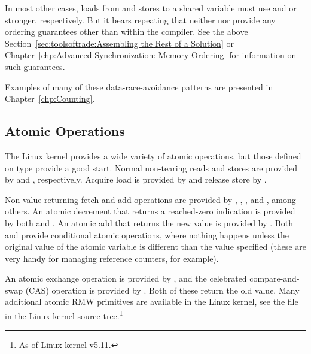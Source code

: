 \QuickQuizEnd

In most other cases, loads from and stores to a shared variable must
use  and  or stronger, respectively.
But it bears repeating that neither  nor 
provide any ordering guarantees other than within the compiler.
See the above
Section~\ref{sec:toolsoftrade:Assembling the Rest of a Solution} or
Chapter~\ref{chp:Advanced Synchronization: Memory Ordering}
for information on such guarantees.

Examples of many of these data-race-avoidance patterns are presented in
Chapter~\ref{chp:Counting}.

\subsection{Atomic Operations}
\label{sec:toolsoftrade:Atomic Operations}

The Linux kernel provides a wide variety of atomic operations, but
those defined on type  provide a good start.
Normal non-tearing reads and stores are provided by
 and , respectively.
Acquire load is provided by  and release
store by .

Non-value-returning fetch-and-add operations are provided by
, , , and
, among others.
An atomic decrement that returns a reached-zero indication is provided
by both  and .
An atomic add that returns the new value is provided by
.
Both  and  provide
conditional atomic operations, where nothing happens unless the
original value of the atomic variable is different than the value
specified (these are very handy for managing reference counters, for
example).

An atomic exchange operation is provided by , and
the celebrated compare-and-swap (CAS) operation is provided by
.
Both of these return the old value.
Many additional atomic RMW primitives are available in the Linux kernel,
see the  file in the Linux-kernel
source tree.\footnote{
	As of Linux kernel v5.11.
}

